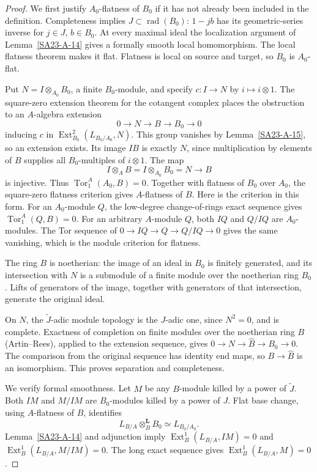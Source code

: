 \begin{proof}
We first justify $A_0$-flatness of $B_0$ if it has not already been
included in the definition. Completeness implies
$J\subset\operatorname{rad}(B_0)$: $1-jb$ has its geometric-series
inverse for $j\in J$, $b\in B_0$. At every maximal ideal the
localization argument of Lemma~\ref{SA23-A-14} gives a formally
smooth local homomorphism. The local flatness theorem
\cite[Proposition 15.41.5]{rootStacksRegular} makes it flat.
Flatness is local on source and target, so $B_0$ is $A_0$-flat.

Put $N=I\otimes_{A_0}B_0$, a finite $B_0$-module, and specify
$c:I\to N$ by $i\mapsto i\otimes1$. The square-zero extension
theorem for the cotangent complex
\cite[Lemma 92.16.1]{rootStacksDeformations} places the obstruction
to an $A$-algebra extension
\[
 0\longrightarrow N\longrightarrow B\longrightarrow B_0
       \longrightarrow0
\]
inducing $c$ in $\operatorname{Ext}^2_{B_0}(L_{B_0/A_0},N)$.
This group vanishes by Lemma~\ref{SA23-A-15}, so an extension
exists. Its image $IB$ is exactly $N$, since multiplication by
elements of $B$ supplies all $B_0$-multiples of $i\otimes1$.
The map
\[
 I\otimes_A B=I\otimes_{A_0}B_0=N\longrightarrow B
\]
is injective. Thus $\operatorname{Tor}_1^A(A_0,B)=0$.
Together with flatness of $B_0$ over $A_0$, the square-zero
flatness criterion gives $A$-flatness of $B$. Here is the criterion
in this form. For an $A_0$-module $Q$, the low-degree
change-of-rings exact sequence gives
$\operatorname{Tor}_1^A(Q,B)=0$. For an arbitrary $A$-module $Q$,
both $IQ$ and $Q/IQ$ are $A_0$-modules. The Tor sequence of
$0\to IQ\to Q\to Q/IQ\to0$ gives the same vanishing, which is
the module criterion for flatness.

The ring $B$ is noetherian: the image of an ideal in $B_0$ is
finitely generated, and its intersection with $N$ is a submodule
of a finite module over the noetherian ring $B_0$. Lifts of
generators of the image, together with generators of that
intersection, generate the original ideal.

On $N$, the $\widetilde J$-adic module topology is the $J$-adic
one, since $N^2=0$, and is complete. Exactness of completion on
finite modules over the noetherian ring $B$ (Artin--Rees), applied
to the extension sequence, gives
$0\to N\to\widehat B\to B_0\to0$. The comparison from the
original sequence has identity end maps, so
$B\to\widehat B$ is an isomorphism. This proves separation
and completeness.

We verify formal smoothness. Let $M$ be any $B$-module killed by
a power of $\widetilde J$. Both $IM$ and $M/IM$ are
$B_0$-modules killed by a power of $J$. Flat base change, using
$A$-flatness of $B$, identifies
\[
 L_{B/A}\otimes_B^{\mathbf L}B_0\simeq L_{B_0/A_0}.
\]
Lemma~\ref{SA23-A-14} and adjunction imply
$\operatorname{Ext}^1_B(L_{B/A},IM)=0$ and
$\operatorname{Ext}^1_B(L_{B/A},M/IM)=0$.
The long exact sequence gives
$\operatorname{Ext}^1_B(L_{B/A},M)=0$.


\end{proof}
